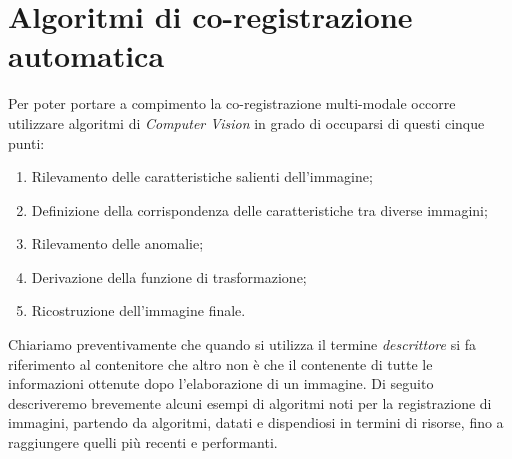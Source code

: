 \section{Algoritmi di co-registrazione automatica}
\noindent Per poter portare a compimento la co-registrazione multi-modale occorre utilizzare algoritmi di \textit{Computer Vision} in grado di occuparsi di questi cinque punti:
\begin{enumerate}
	\item Rilevamento delle caratteristiche salienti dell'immagine; 
	\item Definizione della corrispondenza delle caratteristiche tra diverse immagini;
	\item Rilevamento delle anomalie;
	\item Derivazione della funzione di trasformazione; 
	\item Ricostruzione dell'immagine finale.
\end{enumerate}
\noindent Chiariamo preventivamente che quando si utilizza il termine \textit{descrittore} si fa riferimento al contenitore che altro non è che il contenente di tutte le informazioni ottenute dopo l'elaborazione di un immagine. Di seguito descriveremo brevemente alcuni esempi di algoritmi noti per la registrazione di immagini, partendo da algoritmi, datati e dispendiosi in termini di risorse, fino a raggiungere quelli più recenti e performanti. \par
